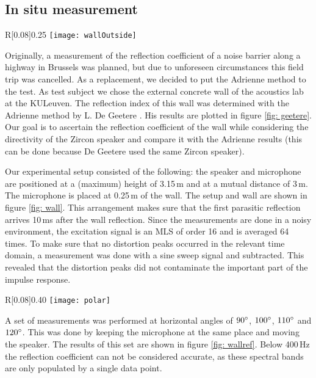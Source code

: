\subsection{In situ measurement}\label{insitu}
\begin{wrapfigure}{R}[0.08\textwidth]{0.25\textwidth}
  \centering
    \texttt{[image: wallOutside]}
  \caption{Picture of the wall and setup.}
  \label{fig: wall}
\end{wrapfigure}
Originally, a measurement of the reflection coefficient of a noise barrier along a highway in Brussels was planned, but due to unforeseen circumstances this field trip was cancelled. As a replacement, we decided to put the Adrienne method to the test. As test subject we chose the external concrete wall of the acoustics lab at the KULeuven. The reflection index of this wall was determined with the Adrienne method by L. De Geetere \cite[p.68]{Geetere}. His results are plotted in figure \ref{fig: geetere}. Our goal is to ascertain the reflection coefficient of the wall while considering the directivity of the Zircon speaker and compare it with the Adrienne results (this can be done because De Geetere used the same Zircon speaker). 

Our experimental setup consisted of the following: the speaker and microphone are positioned at a (maximum) height of 3.15\,m and at a mutual distance of 3\,m. The microphone is placed at 0.25\,m of the wall. The setup and wall are shown in figure \ref{fig: wall}. This arrangement makes sure that the first parasitic reflection arrives 10\,ms after the wall reflection. Since the measurements are done in a noisy environment, the excitation signal is an MLS of order 16 and is averaged 64 times. To make sure that no distortion peaks occurred in the relevant time domain, a measurement was done with a sine sweep signal and subtracted. This revealed that the distortion peaks did not contaminate the important part of the impulse response. 

\begin{wrapfigure}{R}[0.08\textwidth]{0.40\textwidth}
	\vspace{-10pt}
  \centering
    \texttt{[image: polar]}
  \caption{Angular dependence of the frequency response of the speaker for certain frequencies.}
  \label{fig: polar}
\end{wrapfigure}
A set of measurements was performed at horizontal angles of $90^{\circ}$, $100^{\circ}$, $110^{\circ}$ and $120^{\circ}$. This was done by keeping the microphone at the same place and moving the speaker. The results of this set are shown in figure \ref{fig: wallref}. Below 400\,Hz the reflection coefficient can not be considered accurate, as these spectral bands are only populated by a single data point.

